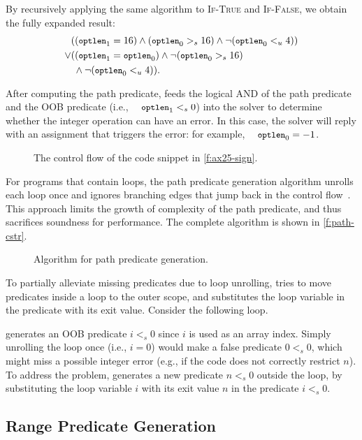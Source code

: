 By recursively applying the same algorithm to \textsc{If-True} and
\textsc{If-False}, we obtain the fully expanded result:
%
\begin{align*}
& ((\optlen_1 = 16) \land (\optlen_0 >_s 16)
    \land \neg(\optlen_0 <_u 4)) \\
\lor & ((\optlen_1 = \optlen_0) \land \neg(\optlen_0 >_s 16) \\
     & \; \land \neg(\optlen_0 <_u 4)).
\end{align*}

After computing the path predicate, \sys feeds the logical AND of the
path predicate and the OOB predicate (i.e., $\cc{optlen}_1 <_s 0$) into
the solver to determine whether the integer operation can have an error.
In this case, the solver will reply with an assignment that triggers
the error: for example, $\cc{optlen}_0 = -1$.

\begin{figure}
\centering
\resizebox{\linewidth}{!}{

}
\caption{The control flow of the code snippet in \autoref{f:ax25-sign}.}
\label{f:cfg}
\end{figure}

For programs that contain loops, the path predicate generation algorithm
unrolls each loop once and ignores branching edges that jump back in the
control flow~\cite{xie:saturn}. This approach limits the growth of complexity
of the path predicate, and thus sacrifices soundness for performance.  
The complete algorithm is shown in \autoref{f:path-cstr}.

\begin{figure}

\caption{Algorithm for path predicate generation.}
\label{f:path-cstr}
\end{figure}

To partially alleviate missing predicates due to loop unrolling,
\sys tries to move predicates inside a loop to the outer scope,
and substitutes the loop variable in the predicate with its exit value.
Consider the following loop.

\sys generates an OOB predicate $i <_s 0$ since $i$ is used
as an array index.  Simply unrolling the loop once (i.e., $i = 0$)
would make a false predicate $0 <_s 0$, which might miss a possible
integer error (e.g., if the code does not correctly restrict $n$).
To address the problem, \sys generates a new predicate $n <_s 0$
outside the loop, by substituting the loop variable $i$ with its
exit value $n$ in the predicate $i <_s 0$.

\subsection{Range Predicate Generation}
\label{s:gen:range}

